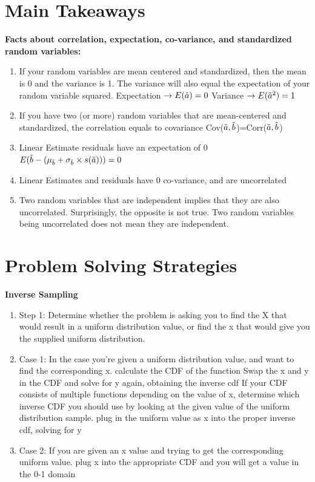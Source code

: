 \documentclass[12pt,twoside]{article}
\newcommand{\rnd}{\Tilde}
\newcommand{\ra}{\rnd{ a}  }
\newcommand{\rb}{\rnd{ b}  }
\begin{document}
\section*{Main Takeaways}
\textbf{Facts about correlation, expectation, co-variance, and standardized random variables:}
\begin{enumerate}
    \item If your random variables are mean centered and standardized, then the mean is 0 and the variance is 1. The variance will also equal the expectation of your random variable squared. 
    \subitem Expectation $\rightarrow E(\ra) = 0$ Variance $\rightarrow E(\ra^2)=1$
    \item If you have two (or more) random variables that are mean-centered and standardized, the correlation equals to covariance 
    \subitem Cov($\ra,\rb$)=Corr($\ra,\rb$)
    \item Linear Estimate residuals have an expectation of 0
    \subitem $E(\rb - (\mu_{\rb} + \sigma_{\rb} \times s(\ra)))=0$
    \item Linear Estimates and residuals have 0 co-variance, and are uncorrelated
    \item Two random variables that are independent implies that they are also uncorrelated. Surprisingly, the opposite is not true. Two random variables being uncorrelated does not mean they are independent.  
    
\end{enumerate}

\section*{Problem Solving Strategies}
\textbf{Inverse Sampling}
\begin{enumerate}
    \item Step 1: Determine whether the problem is asking you to find the X that would result in a uniform distribution value, or find the x that would give you the supplied uniform distribution.
    
    \item Case 1: In the case you're given a uniform distribution value, and want to find the corresponding x.
    \subitem calculate the CDF of the function
    \subitem Swap the x and y in the CDF and solve for y again, obtaining the inverse cdf
    \subitem If your CDF consists of multiple functions depending on the value of x, determine which inverse CDF you should use by looking at the given value of the uniform distribution sample. 
    \subitem plug in the uniform value as x into the proper inverse cdf, solving for y
    
    \item Case 2: If you are given an x value and trying to get the corresponding uniform value.
    \subitem plug x into the appropriate CDF and you will get a value in the 0-1 domain 
  
\end{enumerate}
\end{document}
